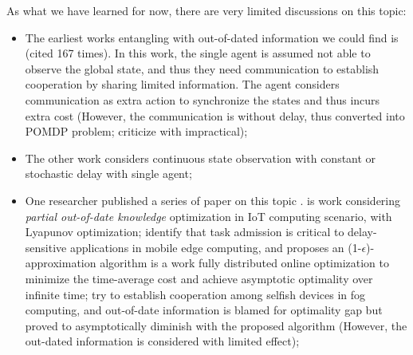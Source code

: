 {    As what we have learned for now, there are very limited discussions on this topic:
    \begin{itemize}
        \item The earliest works entangling with out-of-dated information we could find is \cite{ref-01} (cited 167 times). In this work, the single agent is assumed not able to observe the global state, and thus they need communication to establish cooperation by sharing limited information. The agent considers communication as extra action to synchronize the states and thus incurs extra cost (However, the communication is without delay, thus converted into POMDP problem; criticize with impractical);
        \item The other work \cite{ref-02} considers continuous state observation with constant or stochastic delay with single agent;
        \item One researcher published a series of paper on this topic \cite{Lyu2017,Lyu2018,Lyu2018a,Lyu2018b}.
            \cite{Lyu2017} is work considering \emph{partial out-of-date knowledge} optimization in IoT computing scenario, with Lyapunov optimization;
             \cite{Lyu2018} identify that task admission is critical to delay-sensitive applications in mobile edge computing, and proposes an (1-$\epsilon$)-approximation algorithm
             \cite{Lyu2018a} is a work fully distributed online optimization to minimize the time-average cost and achieve asymptotic optimality over infinite time;
            \cite{Lyu2018b} try to establish cooperation among selfish devices in fog computing, and out-of-date information is blamed for optimality gap but proved to asymptotically diminish with the proposed algorithm (However, the out-dated information is considered with limited effect);
    \end{itemize}
}

